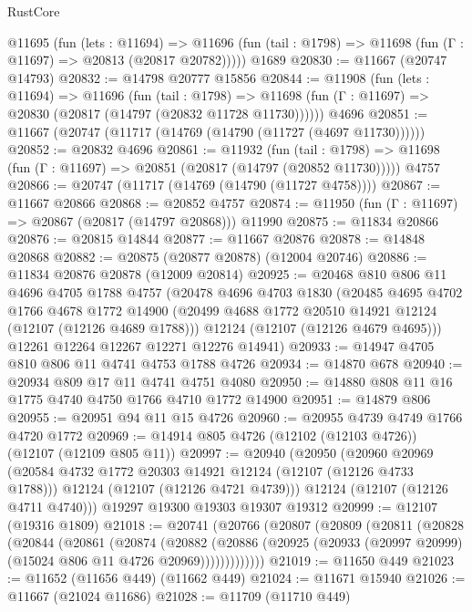 \begin{lexlean}{RustCore}
\begin{coremodule}
    @11695
      (fun (lets : @11694) =>
      @11696 (fun (tail : @1798) => @11698 (fun (Γ : @11697) => @20813 (@20817 @20782)))))
    @1689
@20830 := @11667 (@20747 @14793)
@20832 := @14798 @20777 @15856
@20844 := @11908
    (fun (lets : @11694) =>
    @11696
      (fun (tail : @1798) =>
      @11698 (fun (Γ : @11697) => @20830 (@20817 (@14797 (@20832 @11728 @11730))))))
    @4696
@20851 := @11667 (@20747 (@11717 (@14769 (@14790 (@11727 (@4697 @11730))))))
@20852 := @20832 @4696
@20861 := @11932
    (fun (tail : @1798) => @11698 (fun (Γ : @11697) => @20851 (@20817 (@14797 (@20852 @11730)))))
    @4757
@20866 := @20747 (@11717 (@14769 (@14790 (@11727 @4758))))
@20867 := @11667 @20866
@20868 := @20852 @4757
@20874 := @11950 (fun (Γ : @11697) => @20867 (@20817 (@14797 @20868))) @11990
@20875 := @11834 @20866
@20876 := @20815 @14844
@20877 := @11667 @20876
@20878 := @14848 @20868
@20882 := @20875 (@20877 @20878) (@12004 @20746)
@20886 := @11834 @20876 @20878 (@12009 @20814)
@20925 := @20468
    @810
    @806
    @11
    @4696
    @4705
    @1788
    @4757
    (@20478
      @4696
      @4703
      @1830
      (@20485
        @4695
        @4702
        @1766
        @4678
        @1772
        @14900
        (@20499 @4688 @1772 @20510 @14921 @12124 (@12107 (@12126 @4689 @1788)))
        @12124
        (@12107 (@12126 @4679 @4695)))
      @12261
      @12264
      @12267
      @12271
      @12276
      @14941)
@20933 := @14947 @4705 @810 @806 @11 @4741 @4753 @1788 @4726
@20934 := @14870 @678
@20940 := @20934 @809 @17 @11 @4741 @4751 @4080
@20950 := @14880 @808 @11 @16 @1775 @4740 @4750 @1766 @4710 @1772 @14900
@20951 := @14879 @806
@20955 := @20951 @94 @11 @15 @4726
@20960 := @20955 @4739 @4749 @1766 @4720 @1772
@20969 := @14914 @805 @4726 (@12102 (@12103 @4726)) (@12107 (@12109 @805 @11))
@20997 := @20940
    (@20950
      (@20960
        @20969
        (@20584 @4732 @1772 @20303 @14921 @12124 (@12107 (@12126 @4733 @1788)))
        @12124
        (@12107 (@12126 @4721 @4739)))
      @12124
      (@12107 (@12126 @4711 @4740)))
    @19297
    @19300
    @19303
    @19307
    @19312
@20999 := @12107 (@19316 @1809)
@21018 := @20741
    (@20766
      (@20807
        (@20809
          (@20811
            (@20828
              (@20844
                (@20861
                  (@20874
                    (@20882
                      (@20886
                        (@20925 (@20933 (@20997 @20999) (@15024 @806 @11 @4726 @20969)))))))))))))
@21019 := @11650 @449
@21023 := @11652 (@11656 @449) (@11662 @449)
@21024 := @11671 @15940
@21026 := @11667 (@21024 @11686)
@21028 := @11709 (@11710 @449)

\end{coremodule}
\end{lexlean}
